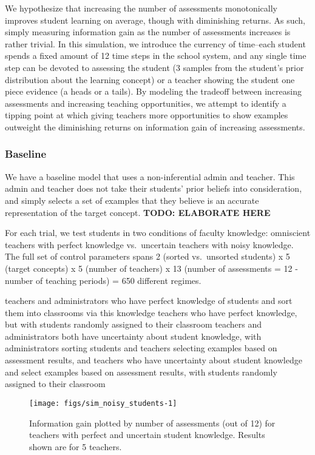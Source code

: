 \documentclass[10pt, letterpaper]{article}
\newenvironment{CodeChunk}{}{}
\begin{document}
We hypothesize that increasing the number of assessments monotonically
improves student learning on average, though with diminishing returns.
As such, simply measuring information gain as the number of assessments
increases is rather trivial. In this simulation, we introduce the
currency of time--each student spends a fixed amount of 12 time steps in
the school system, and any single time step can be devoted to assessing
the student (3 samples from the student's prior distribution about the
learning concept) or a teacher showing the student one piece evidence (a
heads or a tails). By modeling the tradeoff between increasing
assessments and increasing teaching opportunities, we attempt to
identify a tipping point at which giving teachers more opportunities to
show examples outweight the diminishing returns on information gain of
increasing assessments.

\subsubsection{Baseline}\label{baseline}

We have a baseline model that uses a non-inferential admin and teacher.
This admin and teacher does not take their students' prior beliefs into
consideration, and simply selects a set of examples that they believe is
an accurate representation of the target concept. \textbf{TODO:
ELABORATE HERE}

For each trial, we test students in two conditions of faculty knowledge:
omniscient teachers with perfect knowledge vs.~uncertain teachers with
noisy knowledge. The full set of control parameters spans 2 (sorted
vs.~unsorted students) x 5 (target concepts) x 5 (number of teachers) x
13 (number of assessments = 12 - number of teaching periods) = 650
different regimes.

teachers and administrators who have perfect knowledge of students and
sort them into classrooms via this knowledge teachers who have perfect
knowledge, but with students randomly assigned to their classroom
teachers and administrators both have uncertainty about student
knowledge, with administrators sorting students and teachers selecting
examples based on assessment results, and teachers who have uncertainty
about student knowledge and select examples based on assessment results,
with students randomly assigned to their classroom

\begin{CodeChunk}
\begin{figure*}[t]
\texttt{[image: figs/sim\_noisy\_students-1]} \caption[Information gain plotted by number of assessments (out of 12) for teachers with perfect and uncertain student knowledge]{Information gain plotted by number of assessments (out of 12) for teachers with perfect and uncertain student knowledge. Results shown are for 5 teachers.}\label{fig:sim_noisy_students}
\end{figure*}
\end{CodeChunk}
\end{document}
